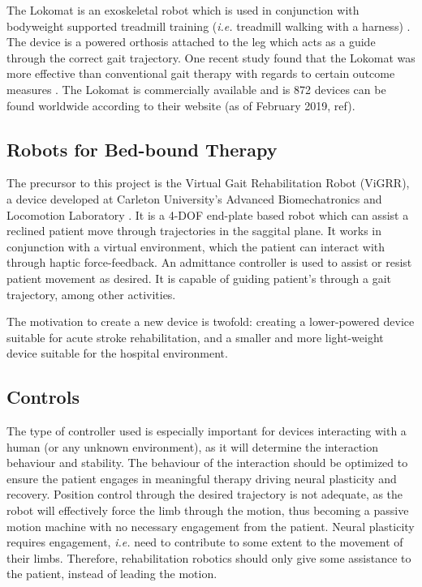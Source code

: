 \documentclass[12pt]{report}
\begin{document}
	The Lokomat is an exoskeletal robot which is used in conjunction with bodyweight supported treadmill training (\textit{i.e.} treadmill walking with a harness) \cite{Jezernik2003}. The device is a powered orthosis attached to the leg which acts as a guide through the correct gait trajectory. One recent study found that the Lokomat was more effective than conventional gait therapy with regards to certain outcome measures \cite{Nam2017}. The Lokomat is commercially available and is 872 devices can be found worldwide according to their website (as of February 2019, ref).
	
	
	\subsection{Robots for Bed-bound Therapy}
	
	The precursor to this project is the Virtual Gait Rehabilitation Robot (ViGRR), a device developed at Carleton University's Advanced Biomechatronics and Locomotion Laboratory \cite{Chisholm2014, Chisholm2010}. It is a 4-DOF end-plate based robot which can assist a reclined patient move through trajectories in the saggital plane. It works in conjunction with a virtual environment, which the patient can interact with through haptic force-feedback. An admittance controller is used to assist or resist patient movement as desired. It is capable of guiding patient's through a gait trajectory, among other activities. 
	
	The motivation to create a new device is twofold: creating a lower-powered device suitable for acute stroke rehabilitation, and a smaller and more light-weight device suitable for the hospital environment. 
	
	\subsection{Controls} 
	
	The type of controller used is especially important for devices interacting with a human (or any unknown environment), as it will determine the interaction behaviour and stability. The behaviour of the interaction should be optimized to ensure the patient engages in meaningful therapy driving neural plasticity and recovery. Position control through the desired trajectory is not adequate, as the robot will effectively force the limb through the motion, thus becoming a passive motion machine with no necessary engagement from the patient. Neural plasticity requires engagement, \textit{i.e.} need to contribute to some extent to the movement of their limbs. Therefore, rehabilitation robotics should only give some assistance to the patient, instead of leading the motion. 
	
\end{document}
